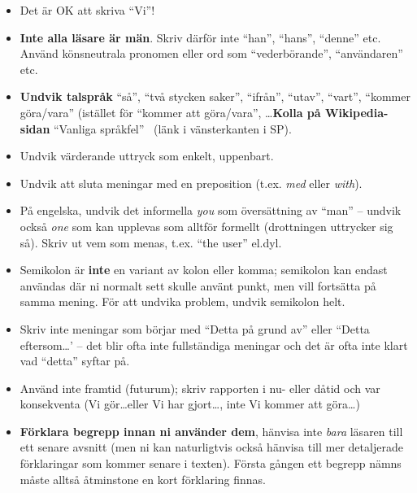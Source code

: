 \documentclass[a4paper,12pt]{article}
\begin{document}
\begin{itemize}
\item    Det är OK att skriva ``Vi''!

\item    \textbf{Inte alla läsare är män}.  Skriv därför inte ``han'', ``hans'', ``denne'' etc.  Använd könsneutrala pronomen eller ord som ``vederbörande'', ``användaren'' etc.

\item    \textbf{Undvik talspråk} ``så'', ``två stycken saker'', ``ifrån'', ``utav'', ``vart'', ``kommer göra/vara'' (istället för ``kommer att göra/vara'', \ldots \textbf{Kolla på Wikipedia-sidan} ``Vanliga språkfel''~\cite{wp:sprakfel} (länk i vänsterkanten i SP).

\item    Undvik värderande uttryck som enkelt, uppenbart.

\item Undvik att sluta meningar med en preposition (t.ex. \emph{med} eller \emph{with}).

\item På engelska, undvik det informella \emph{you} som översättning av ``man'' -- undvik också \emph{one} som kan upplevas som alltför formellt (drottningen uttrycker sig så). Skriv ut vem som menas, t.ex. ``the user'' el.dyl.

\item    Semikolon är \textbf{inte} en variant av kolon eller komma; semikolon kan endast användas där ni normalt sett skulle använt punkt, men vill fortsätta på samma mening. För att undvika problem, undvik semikolon helt.

\item    Skriv inte meningar som börjar med ``Detta på grund av'' eller ``Detta eftersom\ldots' -- det blir ofta inte fullständiga meningar och det är ofta inte klart vad ``detta'' syftar på.

\item    Använd inte framtid (futurum); skriv rapporten i nu- eller dåtid och var konsekventa (Vi gör\ldots eller Vi har gjort\ldots, inte Vi kommer att göra\ldots)

\item    \textbf{Förklara begrepp innan ni använder dem}, hänvisa inte \emph{bara} läsaren till ett senare avsnitt (men ni kan naturligtvis också hänvisa till mer detaljerade förklaringar som kommer senare i texten).  Första gången ett begrepp nämns måste alltså åtminstone en kort förklaring finnas.


\end{itemize}
\end{document}
